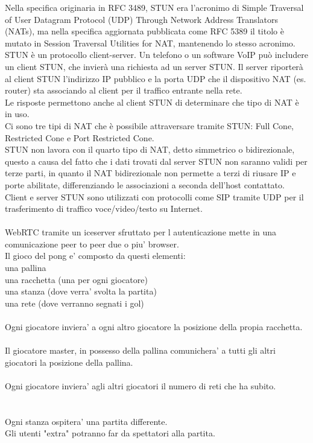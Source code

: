 ﻿\documentclass[11pt, a4paper, titlepage, block]{article}
\begin{document}
Nella specifica originaria in RFC 3489, STUN era l'acronimo di Simple Traversal of User Datagram Protocol (UDP) Through Network Address Translators (NATs), ma nella specifica aggiornata pubblicata come RFC 5389 il titolo è mutato in Session Traversal Utilities for NAT, mantenendo lo stesso acronimo.\\

STUN è un protocollo client-server. Un telefono o un software VoIP può includere un client STUN, che invierà una richiesta ad un server STUN. Il server riporterà al client STUN l'indirizzo IP pubblico e la porta UDP che il dispositivo NAT (es. router) sta associando al client per il traffico entrante nella rete.\\
Le risposte permettono anche al client STUN di determinare che tipo di NAT è in uso.\\
Ci sono tre tipi di NAT che è possibile attraversare tramite STUN: Full Cone, Restricted Cone e Port Restricted Cone.\\
STUN non lavora con il quarto tipo di NAT, detto simmetrico o bidirezionale, questo a causa del fatto che i dati trovati dal server STUN non saranno validi per terze parti, in quanto il NAT bidirezionale non permette a terzi di riusare IP e porte abilitate, differenziando le associazioni a seconda dell'host contattato.\\

Client e server STUN sono utilizzati con protocolli come SIP tramite UDP per il trasferimento di traffico voce/video/testo su Internet.\\
\\

WebRTC tramite un iceserver sfruttato per l autenticazione mette in una comunicazione peer to peer due o piu' browser.\\
Il gioco del pong e' composto da questi elementi:\\
una pallina\\
una racchetta (una per ogni giocatore)\\
una stanza (dove verra' svolta la partita)\\
una rete (dove verranno segnati i gol)\\
\\
Ogni giocatore inviera' a ogni altro giocatore la posizione della propia racchetta.\\
\\
Il giocatore master, in possesso della pallina comunichera' a tutti gli altri giocatori la posizione della pallina.\\
\\
Ogni giocatore inviera' agli altri giocatori il numero di reti che ha subito.\\
\\
\\
Ogni stanza ospitera' una partita differente.\\
Gli utenti "extra" potranno far da spettatori alla partita.\\
\end{document}
